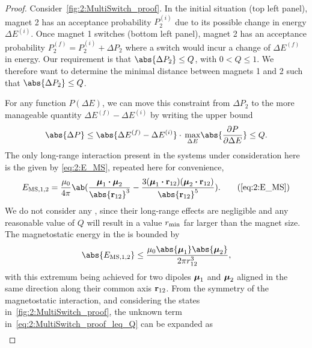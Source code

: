 \begin{proof}
	Consider~\cref{fig:2:MultiSwitch_proof}.
	In the initial situation (top left panel), magnet 2 has an acceptance probability $P_2^{(i)}$ due to its possible change in energy $\Delta E^{(i)}$.
	Once magnet 1 switches (bottom left panel), magnet 2 has an acceptance probability $P_2^{(f)} = P_2^{(i)} + \Delta P_2$ where a switch would incur a change of $\Delta E^{(f)}$ in energy.
	Our requirement is that $\abs{\Delta P_2} \leq Q$, with $0 < Q \leq 1$.
	We therefore want to determine the minimal distance between magnets 1 and 2 such that $\abs{\Delta P_2} \leq Q$. \par
	For any function $P(\Delta E)$, we can move this constraint from $\Delta P_2$ to the more manageable quantity $\Delta E^{(f)} - \Delta E^{(i)}$ by writing the upper bound
	\begin{equation}
		\abs{\Delta P} \leq \abs{\Delta E^{(f)} - \Delta E^{(i)}} \cdot \, \underset{\Delta E}{\max} \abs{\frac{\partial P}{\partial \Delta E}} \leq Q \mathrm{.}
		\label{eq:2:MultiSwitch_proof_leq_Q}
	\end{equation}
	The only long-range interaction present in the systems under consideration here is the  given by \eqref{eq:2:E_MS}, repeated here for convenience,
	\begin{equation*}
		E_{\mathrm{MS},1,2} = \frac{\mu_0}{4 \pi} \ab(\frac{\vc{\mu}_1 \bcdot \vc{\mu}_2}{\abs{\vc{r}_{12}}^3} - \frac{3(\vc{\mu}_1 \bcdot \vc{r}_{12}) (\vc{\mu}_2 \bcdot \vc{r}_{12})}{\abs{\vc{r}_{12}}^5}) \mathrm{.}  \tag{\ref*{eq:2:E_MS}}
	\end{equation*}
	We do not consider any , since their long-range effects are negligible and any reasonable value of $Q$ will result in a value $r_\mathrm{min}$ far larger than the magnet size.
	The magnetostatic energy in the  is bounded by
	\begin{equation}
		\abs{E_{\mathrm{MS},1,2}} \leq \frac{\mu_0 \abs{\vc{\mu}_1} \abs{\vc{\mu}_2}}{2 \pi r_{12}^3} \mathrm{,}
		\label{eq:2:MultiSwitch_proof_EMS_leq}
	\end{equation}
	with this extremum being achieved for two dipoles $\boldsymbol{\mathbf{\mu}}_1$ and $\boldsymbol{\mathbf{\mu}}_2$ aligned in the same direction along their common axis $\boldsymbol{\mathbf{r}}_{12}$.
	From the symmetry of the magnetostatic interaction, and considering the states in~\cref{fig:2:MultiSwitch_proof}, the unknown term in~\cref{eq:2:MultiSwitch_proof_leq_Q} can be expanded as 
	\begin{align*}

\end{align*}
\end{proof}
